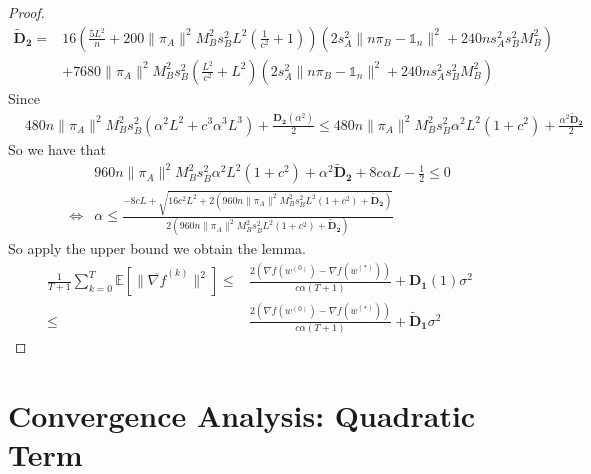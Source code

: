 \documentclass{article}
\newcommand{\EE}[1]{\mathbb{E}\left[#1\right]}
\newcommand{\norm}[1]{\| #1 \|}
\newcommand{\one}{\mathds{1}_n}
\begin{document}
\begin{proof}
\begin{align*}
\mathbf{\tilde{D}_2}=&16\left(\frac{5L^2}{n}+200\norm{\pi_A}^2M_B^2s_B^2L^2\left(\frac{1}{c^2}+1\right)\right)\left(2s_A^2\norm{n\pi_B-\one}^2+240ns_A^2s_B^2M_B^2\right) \\
  &+7680\norm{\pi_A}^2M_B^2s_B^2\left(\frac{L^2}{c^2}+ L^2\right)\left(2s_A^2\norm{n\pi_B-\one}^2+240ns_A^2s_B^2M_B^2\right)
\end{align*}
Since 
\begin{align*}
&480n\norm{\pi_A}^2M_B^2s_B^2\left(\alpha^2L^2+c^3\alpha^3 L^3\right)+\frac{\mathbf{D_2}(\alpha^2)}{2}\leq480n\norm{\pi_A}^2M_B^2s_B^2\alpha^2L^2\left(1+c^2\right)+\frac{\alpha^2\mathbf{\tilde{D}_2}}{2}
\end{align*}
So we have that 
\begin{align*}
&960n\norm{\pi_A}^2M_B^2s_B^2\alpha^2L^2\left(1+c^2\right)+\alpha^2\mathbf{\tilde{D}_2}+8c\alpha L-\frac{1}{2}\leq 0\\
\iff  &  \alpha \leq \frac{-8cL+\sqrt{16c^2L^2+2\left(960n\norm{\pi_A}^2M_B^2s_B^2L^2\left(1+c^2\right)+\mathbf{\tilde{D}_2}\right)}}{2\left(960n\norm{\pi_A}^2M_B^2s_B^2L^2\left(1+c^2\right)+\mathbf{\tilde{D}_2}\right)}
\end{align*}
So apply the upper bound we obtain the lemma.
\begin{align*}
 \frac{1}{T+1}\sum_{k=0}^T\EE{\norm{\overline{\nabla f}^{(k)}}^2}\leq&\frac{2(\nabla f(w^{(0)})-\nabla f(w^{(*)}))}{c\alpha(T+1)}+\mathbf{D_1}(1)\sigma^2\\
 \leq&\frac{2(\nabla f(w^{(0)})-\nabla f(w^{(*)}))}{c\alpha(T+1)}+\mathbf{\tilde{D}_1}\sigma^2
\end{align*}
\end{proof}

\section{Convergence Analysis: Quadratic Term}
\end{document}
